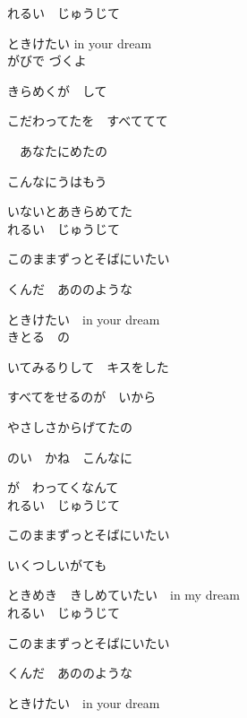 \large{

れるい　じゅうじて

ときけたい  in your dream
\\

がびで  づくよ

きらめくが　して

こだわってたを　すべててて

　あなたにめたの

こんなにうはもう

いないとあきらめてた
\\

れるい　じゅうじて

このままずっとそばにいたい

くんだ　あののような

ときけたい　in your dream
\\

きとる　の

いてみるりして　キスをした

すべてをせるのが　いから

やさしさからげてたの

のい　かね　こんなに

が　わってくなんて
\\

れるい　じゅうじて

このままずっとそばにいたい

いくつしいがても

ときめき　きしめていたい　in my dream
\\

れるい　じゅうじて

このままずっとそばにいたい

くんだ　あののような

ときけたい　in your dream

}